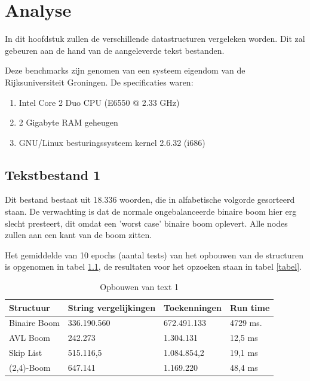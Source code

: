 \chapter{Analyse}
\label{sec:Hoofdstuk 7}

In dit hoofdstuk zullen de verschillende datastructuren vergeleken worden. Dit zal gebeuren aan de hand van de aangeleverde tekst bestanden.

Deze benchmarks zijn genomen van een systeem eigendom van de Rijksuniversiteit Groningen. De specificaties waren:

\begin{enumerate}
  \item Intel Core 2 Duo CPU (E6550 @ 2.33 GHz)
	\item 2 Gigabyte RAM geheugen
	\item GNU/Linux besturingssysteem kernel 2.6.32 (i686)
\end{enumerate}

\section{Tekstbestand 1}

Dit bestand bestaat uit 18.336 woorden, die in alfabetische volgorde gesorteerd staan. De verwachting is dat de normale ongebalanceerde binaire boom hier erg slecht presteert, dit omdat een 'worst case' binaire boom oplevert. Alle nodes zullen aan een kant van de boom zitten.

Het gemiddelde van 10 epochs (aantal tests) van het opbouwen van de structuren is opgenomen in tabel \ref{tbl_text1_build}, de resultaten voor het opzoeken staan in tabel \ref{tabel}.

\begin{table}
\begin{tabularx}{\linewidth}{| l | X| X| X | }
 \hline
Structuur & String vergelijkingen &  Toekenningen & Run time \\
 \hline
 	Binaire Boom & 336.190.560 & 672.491.133 & 4729 ms. \\
 	\hline
 	AVL Boom & 242.273 & 1.304.131 & 12,5 ms \\
 	\hline
 	Skip List & 515.116,5 & 1.084.854,2 & 19,1 ms \\
 	\hline
 	(2,4)-Boom & 647.141 & 1.169.220 & 48,4 ms \\
 	\hline
\end{tabularx}
\label{tbl_text1_build}
\caption{Opbouwen van text 1}
\end{table}

